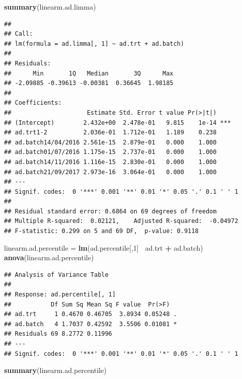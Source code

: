 \documentclass[]{book}
\newenvironment{Shaded}{\begin{snugshade}}{\end{snugshade}}
\newcommand{\KeywordTok}[1]{\textcolor[rgb]{0.13,0.29,0.53}{\textbf{#1}}}
\newcommand{\DecValTok}[1]{\textcolor[rgb]{0.00,0.00,0.81}{#1}}
\newcommand{\StringTok}[1]{\textcolor[rgb]{0.31,0.60,0.02}{#1}}
\newcommand{\OperatorTok}[1]{\textcolor[rgb]{0.81,0.36,0.00}{\textbf{#1}}}
\newcommand{\NormalTok}[1]{#1}
\begin{document}
\begin{Shaded}
\begin{Highlighting}[]
\KeywordTok{summary}\NormalTok{(linearm.ad.limma)}
\end{Highlighting}
\end{Shaded}

\begin{verbatim}
## 
## Call:
## lm(formula = ad.limma[, 1] ~ ad.trt + ad.batch)
## 
## Residuals:
##      Min       1Q   Median       3Q      Max 
## -2.09885 -0.39613 -0.00381  0.36645  1.98185 
## 
## Coefficients:
##                     Estimate Std. Error t value Pr(>|t|)    
## (Intercept)        2.432e+00  2.478e-01   9.815    1e-14 ***
## ad.trt1-2          2.036e-01  1.712e-01   1.189    0.238    
## ad.batch14/04/2016 2.561e-15  2.879e-01   0.000    1.000    
## ad.batch01/07/2016 1.175e-15  2.737e-01   0.000    1.000    
## ad.batch14/11/2016 1.116e-15  2.830e-01   0.000    1.000    
## ad.batch21/09/2017 2.973e-16  3.064e-01   0.000    1.000    
## ---
## Signif. codes:  0 '***' 0.001 '**' 0.01 '*' 0.05 '.' 0.1 ' ' 1
## 
## Residual standard error: 0.6864 on 69 degrees of freedom
## Multiple R-squared:  0.02121,    Adjusted R-squared:  -0.04972 
## F-statistic: 0.299 on 5 and 69 DF,  p-value: 0.9118
\end{verbatim}

\begin{Shaded}
\begin{Highlighting}[]
\NormalTok{linearm.ad.percentile =}\StringTok{ }\KeywordTok{lm}\NormalTok{(ad.percentile[,}\DecValTok{1}\NormalTok{]}\OperatorTok{~}\StringTok{ }\NormalTok{ad.trt }\OperatorTok{+}\StringTok{ }\NormalTok{ad.batch)}
\KeywordTok{anova}\NormalTok{(linearm.ad.percentile)}
\end{Highlighting}
\end{Shaded}

\begin{verbatim}
## Analysis of Variance Table
## 
## Response: ad.percentile[, 1]
##           Df Sum Sq Mean Sq F value  Pr(>F)  
## ad.trt     1 0.4670 0.46705  3.8934 0.05248 .
## ad.batch   4 1.7037 0.42592  3.5506 0.01081 *
## Residuals 69 8.2772 0.11996                  
## ---
## Signif. codes:  0 '***' 0.001 '**' 0.01 '*' 0.05 '.' 0.1 ' ' 1
\end{verbatim}

\begin{Shaded}
\begin{Highlighting}[]
\KeywordTok{summary}\NormalTok{(linearm.ad.percentile)}
\end{Highlighting}
\end{Shaded}
\end{document}
